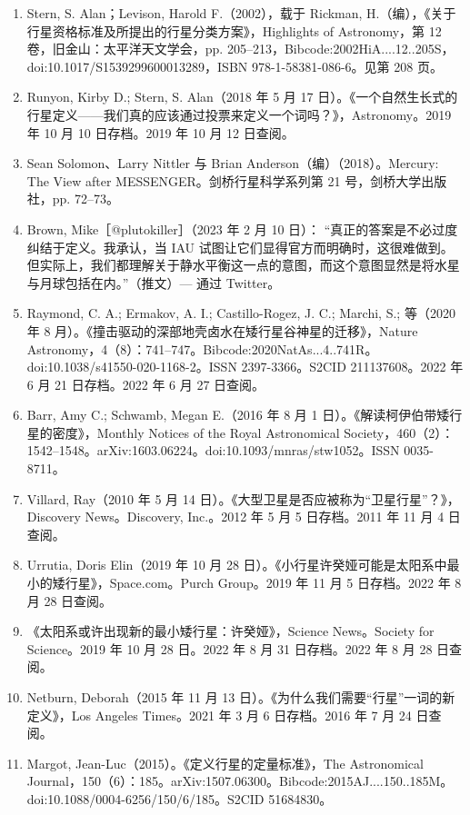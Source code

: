 \begin{enumerate}
\item Stern, S. Alan；Levison, Harold F.（2002），载于 Rickman, H.（编），《关于行星资格标准及所提出的行星分类方案》，Highlights of Astronomy，第 12 卷，旧金山：太平洋天文学会，pp. 205–213，Bibcode:2002HiA....12..205S，doi:10.1017/S1539299600013289，ISBN 978-1-58381-086-6。见第 208 页。
\item Runyon, Kirby D.; Stern, S. Alan（2018 年 5 月 17 日）。《一个自然生长式的行星定义——我们真的应该通过投票来定义一个词吗？》，Astronomy。2019 年 10 月 10 日存档。2019 年 10 月 12 日查阅。
\item Sean Solomon、Larry Nittler 与 Brian Anderson（编）（2018）。Mercury: The View after MESSENGER。剑桥行星科学系列第 21 号，剑桥大学出版社，pp. 72–73。
\item Brown, Mike［@plutokiller］（2023 年 2 月 10 日）：
“真正的答案是不必过度纠结于定义。我承认，当 IAU 试图让它们显得官方而明确时，这很难做到。但实际上，我们都理解关于静水平衡这一点的意图，而这个意图显然是将水星与月球包括在内。”（推文）— 通过 Twitter。
\item Raymond, C. A.; Ermakov, A. I.; Castillo-Rogez, J. C.; Marchi, S.; 等（2020 年 8 月）。《撞击驱动的深部地壳卤水在矮行星谷神星的迁移》，Nature Astronomy，4（8）：741–747。Bibcode:2020NatAs...4..741R。doi:10.1038/s41550-020-1168-2。ISSN 2397-3366。S2CID 211137608。2022 年 6 月 21 日存档。2022 年 6 月 27 日查阅。
\item Barr, Amy C.; Schwamb, Megan E.（2016 年 8 月 1 日）。《解读柯伊伯带矮行星的密度》，Monthly Notices of the Royal Astronomical Society，460（2）：1542–1548。arXiv:1603.06224。doi:10.1093/mnras/stw1052。ISSN 0035-8711。
\item Villard, Ray（2010 年 5 月 14 日）。《大型卫星是否应被称为“卫星行星”？》，Discovery News。Discovery, Inc.。2012 年 5 月 5 日存档。2011 年 11 月 4 日查阅。
\item Urrutia, Doris Elin（2019 年 10 月 28 日）。《小行星许癸娅可能是太阳系中最小的矮行星》，Space.com。Purch Group。2019 年 11 月 5 日存档。2022 年 8 月 28 日查阅。
\item 《太阳系或许出现新的最小矮行星：许癸娅》，Science News。Society for Science。2019 年 10 月 28 日。2022 年 8 月 31 日存档。2022 年 8 月 28 日查阅。
\item Netburn, Deborah（2015 年 11 月 13 日）。《为什么我们需要“行星”一词的新定义》，Los Angeles Times。2021 年 3 月 6 日存档。2016 年 7 月 24 日查阅。
\item Margot, Jean-Luc（2015）。《定义行星的定量标准》，The Astronomical Journal，150（6）：185。arXiv:1507.06300。Bibcode:2015AJ....150..185M。doi:10.1088/0004-6256/150/6/185。S2CID 51684830。

\end{enumerate}
